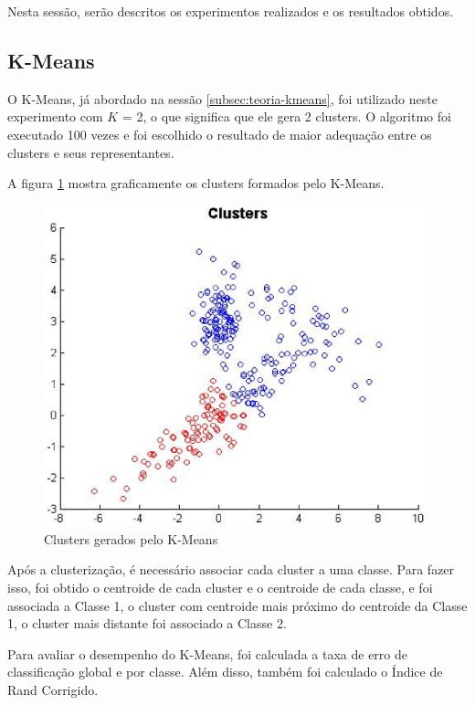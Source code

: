 
Nesta sessão, serão descritos os experimentos realizados e os resultados obtidos.

\subsection{K-Means}
\label{subsec:exp-kmeans}

O K-Means, já abordado na sessão \ref{subsec:teoria-kmeans}, foi utilizado neste experimento com $K$ = 2, o que significa que ele gera 2 clusters. O algoritmo foi executado 100 vezes e foi escolhido o resultado de maior adequação entre os clusters e seus representantes.

A figura \ref{fig:clusters} mostra graficamente os clusters formados pelo K-Means.

\begin{figure}[H]
\center
\includegraphics[scale=0.60]{imagens/tecnicas/clusters.eps}
\caption{Clusters gerados pelo K-Means}
\label{fig:clusters}
\end{figure}

Após a clusterização, é necessário associar cada cluster a uma classe. Para fazer isso, foi obtido o centroide de cada cluster e o centroide de cada classe, e foi associada a Classe 1, o cluster com centroide mais próximo do centroide da Classe 1, o cluster mais distante foi associado a Classe 2.

Para avaliar o desempenho do K-Means, foi calculada a taxa de erro de classificação global e por classe. Além disso, também foi calculado o Índice de Rand Corrigido.

